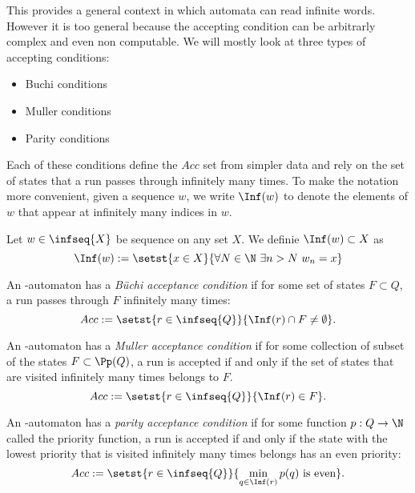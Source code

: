 This provides a general context in which automata can read infinite
words. However it is too general because the accepting condition
can be arbitrarly complex and even non computable.
We will mostly look at three types of accepting conditions:

\begin{multicols}{2}
\begin{itemize}
    \item Buchi conditions
    \item Muller conditions
    \item Parity conditions
\end{itemize}
\end{multicols}

Each of these conditions define the $Acc$ set
from simpler data and rely on the set of states that
a run passes through infinitely many times.
To make the notation more convenient, given a sequence
$w$, we write $\Inf(w)$ to denote the
elements of $w$ that appear at infinitely many indices in $w$.

\begin{definition}
    Let $w \in \infseq{X}$ be sequence on any set $X$.
    We definie $\Inf(w) \subset X$ as
    \[
        \Inf(w) := \setst{x \in X}{
            \forall N \in \N~
            \exists n > N~
            w_n = x
        }
    \]
\end{definition}

\begin{definition}
    An \w-automaton has a \emph{Büchi acceptance condition}
    if for some set of states $F \subset Q$,
    a run passes through $F$ infinitely many times:
    \[
        Acc := \setst{
            r \in \infseq{Q}
        }{
            \Inf(r) \cap F \neq \emptyset
        }.
    \]

    An \w-automaton has a \emph{Muller acceptance condition}
    if for some collection of subset of the states $F \subset \Pp(Q)$,
    a run is accepted if and only if the set of states that
    are visited infinitely many times belongs to $F$.
    \[
        Acc := \setst{
            r \in \infseq{Q}
        }{
            \Inf(r) \in F
        }.
    \]

    An \w-automaton has a \emph{parity acceptance condition}
    if for some function $p : Q \to \N$ called the priority function,
    a run is accepted if and only if the state with the lowest priority
    that is visited infinitely many times belongs has an even priority:
    \[
        Acc := \setst{
            r \in \infseq{Q}
        }{
            \min_{q \in \Inf(r)} p(q) \text{ is even}
        }.
    \]
\end{definition}

